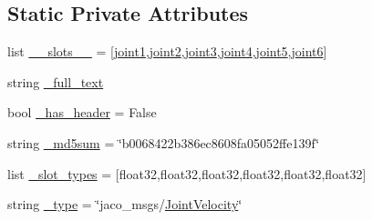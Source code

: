 \subsection*{Static Private Attributes}
\begin{DoxyCompactItemize}
\item 
list \hyperlink{classjaco__msgs_1_1msg_1_1__JointVelocity_1_1JointVelocity_a1490a4a031633db0f4f786b143ef656e}{\+\_\+\+\_\+slots\+\_\+\+\_\+} = \mbox{[}\textquotesingle{}\hyperlink{classjaco__msgs_1_1msg_1_1__JointVelocity_1_1JointVelocity_a06dbd96dcbbb6e6dfbf32bd4c091be28}{joint1}\textquotesingle{},\textquotesingle{}\hyperlink{classjaco__msgs_1_1msg_1_1__JointVelocity_1_1JointVelocity_ac84aa529e626ac3f579462254fc2a3bb}{joint2}\textquotesingle{},\textquotesingle{}\hyperlink{classjaco__msgs_1_1msg_1_1__JointVelocity_1_1JointVelocity_a329d1f63f920e19eadb7d14dff42c27f}{joint3}\textquotesingle{},\textquotesingle{}\hyperlink{classjaco__msgs_1_1msg_1_1__JointVelocity_1_1JointVelocity_a6aa007d0062893c6b55567b4df37fabc}{joint4}\textquotesingle{},\textquotesingle{}\hyperlink{classjaco__msgs_1_1msg_1_1__JointVelocity_1_1JointVelocity_ab54e9649ee9b5be0a5b79e2e6b02c126}{joint5}\textquotesingle{},\textquotesingle{}\hyperlink{classjaco__msgs_1_1msg_1_1__JointVelocity_1_1JointVelocity_a23e291537f4c93aa246efc164af51394}{joint6}\textquotesingle{}\mbox{]}
\item 
string \hyperlink{classjaco__msgs_1_1msg_1_1__JointVelocity_1_1JointVelocity_a8377b6c2480c2c2b18e901dce68640d2}{\+\_\+full\+\_\+text}
\item 
bool \hyperlink{classjaco__msgs_1_1msg_1_1__JointVelocity_1_1JointVelocity_ae86adb698f3bb642c077c21d38191375}{\+\_\+has\+\_\+header} = False
\item 
string \hyperlink{classjaco__msgs_1_1msg_1_1__JointVelocity_1_1JointVelocity_a32be9ed5f087850ba8bb16b451bfa2b2}{\+\_\+md5sum} = \char`\"{}b0068422b386ec8608fa05052ffe139f\char`\"{}
\item 
list \hyperlink{classjaco__msgs_1_1msg_1_1__JointVelocity_1_1JointVelocity_a5f2317894962d3140c85fa59eadabf47}{\+\_\+slot\+\_\+types} = \mbox{[}\textquotesingle{}float32\textquotesingle{},\textquotesingle{}float32\textquotesingle{},\textquotesingle{}float32\textquotesingle{},\textquotesingle{}float32\textquotesingle{},\textquotesingle{}float32\textquotesingle{},\textquotesingle{}float32\textquotesingle{}\mbox{]}
\item 
string \hyperlink{classjaco__msgs_1_1msg_1_1__JointVelocity_1_1JointVelocity_a8aa77c58fc68ef33f56c9f9ce22b8c50}{\+\_\+type} = \char`\"{}jaco\+\_\+msgs/\hyperlink{classjaco__msgs_1_1msg_1_1__JointVelocity_1_1JointVelocity}{Joint\+Velocity}\char`\"{}
\end{DoxyCompactItemize}


